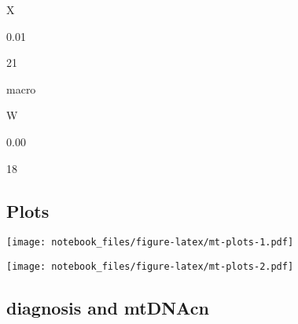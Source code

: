 \documentclass[]{book}
\newenvironment{Shaded}{\begin{snugshade}}{\end{snugshade}}
\newcommand{\DataTypeTok}[1]{\textcolor[rgb]{0.13,0.29,0.53}{#1}}
\newcommand{\DecValTok}[1]{\textcolor[rgb]{0.00,0.00,0.81}{#1}}
\newcommand{\KeywordTok}[1]{\textcolor[rgb]{0.13,0.29,0.53}{\textbf{#1}}}
\newcommand{\NormalTok}[1]{#1}
\newcommand{\OperatorTok}[1]{\textcolor[rgb]{0.81,0.36,0.00}{\textbf{#1}}}
\newcommand{\StringTok}[1]{\textcolor[rgb]{0.31,0.60,0.02}{#1}}
\begin{document}
X

0.01

21

macro

W

0.00

18

\hypertarget{plots-2}{%
\subsection{Plots}\label{plots-2}}

\begin{Shaded}
\end{Shaded}

\texttt{[image: notebook\_files/figure-latex/mt-plots-1.pdf]}

\begin{Shaded}
\end{Shaded}

\texttt{[image: notebook\_files/figure-latex/mt-plots-2.pdf]}

\hypertarget{diagnosis-and-mtdnacn}{%
\subsection{diagnosis and mtDNAcn}\label{diagnosis-and-mtdnacn}}
\end{document}
